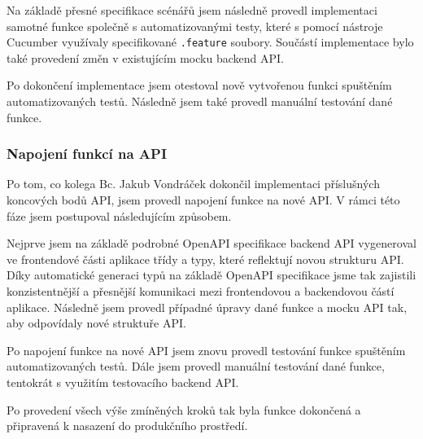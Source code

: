 Na základě přesné specifikace scénářů jsem následně provedl implementaci samotné funkce společně s automatizovanými testy, které s pomocí nástroje Cucumber využívaly specifikované \texttt{.feature} soubory. Součástí implementace bylo také provedení změn v existujícím mocku backend API.

Po dokončení implementace jsem otestoval nově vytvořenou funkci spuštěním automatizovaných testů. Následně jsem také provedl manuální testování dané funkce.

\subsubsection{Napojení funkcí na API}

Po tom, co kolega Bc. Jakub Vondráček dokončil implementaci příslušných koncových bodů API, jsem provedl napojení funkce na nové API. V rámci této fáze jsem postupoval následujícím způsobem.

Nejprve jsem na základě podrobné OpenAPI specifikace backend API vygeneroval ve frontendové části aplikace třídy a typy, které reflektují novou strukturu API. Díky automatické generaci typů na základě OpenAPI specifikace jsme tak zajistili konzistentnější a přesnější komunikaci mezi frontendovou a backendovou částí aplikace. Následně jsem provedl případné úpravy dané funkce a mocku API tak, aby odpovídaly nové struktuře API.

Po napojení funkce na nové API jsem znovu provedl testování funkce spuštěním automatizovaných testů. Dále jsem provedl manuální testování dané funkce, tentokrát s využitím testovacího backend API.

Po provedení všech výše zmíněných kroků tak byla funkce dokončená a připravená k nasazení do produkčního prostředí.  
